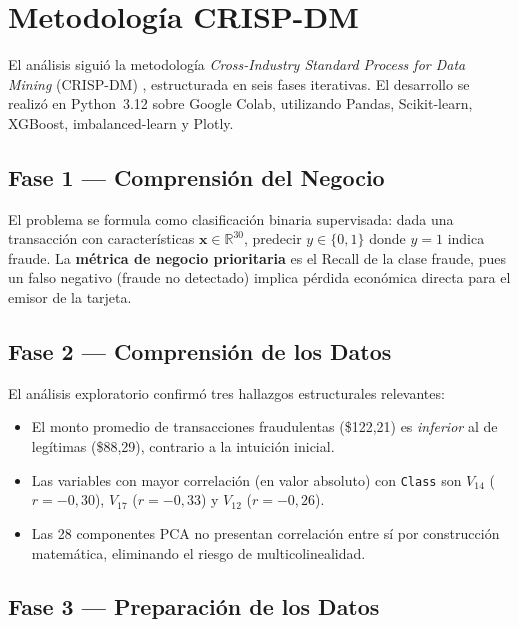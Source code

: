 \documentclass[12pt, a4paper]{article}
\begin{document}
\section{Metodología CRISP-DM}

El análisis siguió la metodología \textit{Cross-Industry Standard Process
for Data Mining} (CRISP-DM) \cite{wirth2000crisp}, estructurada en seis
fases iterativas. El desarrollo se realizó en Python~3.12 sobre Google
Colab, utilizando Pandas, Scikit-learn, XGBoost, imbalanced-learn y Plotly.

\subsection{Fase 1 — Comprensión del Negocio}

El problema se formula como clasificación binaria supervisada: dada una
transacción con características $\mathbf{x} \in \mathbb{R}^{30}$, predecir
$y \in \{0, 1\}$ donde $y=1$ indica fraude. La \textbf{métrica de negocio
prioritaria} es el Recall de la clase fraude, pues un falso negativo
(fraude no detectado) implica pérdida económica directa para el emisor
de la tarjeta.

\subsection{Fase 2 — Comprensión de los Datos}

El análisis exploratorio confirmó tres hallazgos estructurales relevantes:

\begin{itemize}
  \item El monto promedio de transacciones fraudulentas (\$122{,}21) es
        \textit{inferior} al de legítimas (\$88{,}29), contrario a la
        intuición inicial.
  \item Las variables con mayor correlación (en valor absoluto) con
        \texttt{Class} son $V_{14}$ ($r = -0{,}30$), $V_{17}$
        ($r = -0{,}33$) y $V_{12}$ ($r = -0{,}26$).
  \item Las 28 componentes PCA no presentan correlación entre sí por
        construcción matemática, eliminando el riesgo de multicolinealidad.
\end{itemize}

\subsection{Fase 3 — Preparación de los Datos}
\end{document}
